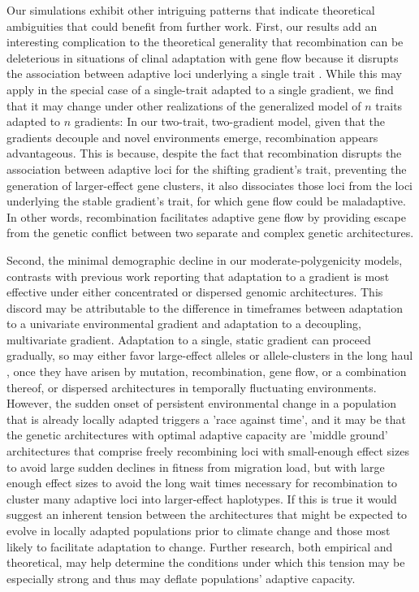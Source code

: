 \documentclass[9pt,twocolumn,twoside,lineno]{pnas-new}
\begin{document}
Our simulations exhibit other intriguing patterns
that indicate theoretical ambiguities that could benefit from further work.
First, our results add an interesting complication
to the theoretical generality that recombination can be deleterious
in situations of clinal adaptation
with gene flow because it disrupts the association between adaptive loci 
underlying a single trait \cite{tigano}.
While this may apply in the special case of a single-trait 
adapted to a single gradient,
we find that it may change under other realizations of the 
generalized model of $n$ traits adapted to $n$ gradients:
In our two-trait, two-gradient model, given that the gradients decouple
and novel environments emerge,
recombination appears advantageous.
This is because, despite the fact that recombination disrupts the association between
adaptive loci for the shifting gradient's trait, preventing the
generation of larger-effect gene clusters,
it also dissociates those loci from the loci underlying
the stable gradient's trait, for which gene flow could be maladaptive.
In other words, recombination facilitates adaptive gene flow
by providing escape from the genetic conflict between
two separate and complex genetic architectures.
 
Second, the minimal demographic decline
in our moderate-polygenicity models,
contrasts with previous work reporting that adaptation
to a gradient is most effective under either
concentrated or dispersed genomic architectures.
This discord may be attributable to the
difference in timeframes between adaptation to a univariate environmental gradient
and adaptation to a decoupling, multivariate gradient.
Adaptation to a single, static gradient can proceed gradually,
so may either favor large-effect alleles or allele-clusters in the long haul
\cite{yeaman_amnat,yeaman_review},
once they have arisen by mutation, recombination, gene flow, or a combination thereof,
or dispersed architectures 
\cite{burger,kondrashov,yeaman_review,yeaman_whitlock}
in temporally fluctuating environments.
However, the sudden onset of persistent environmental change 
in a population that is already locally adapted triggers a 'race against time', 
and it may be that the genetic architectures with
optimal adaptive capacity are 'middle ground' architectures that comprise
freely recombining loci with small-enough effect sizes to avoid large
sudden declines in fitness from migration load,
but with large enough effect sizes to avoid the long wait times necessary
for recombination to cluster many adaptive loci into larger-effect haplotypes.
If this is true it would suggest an inherent tension between the architectures that
might be expected to evolve in locally adapted populations prior to climate change
and those most likely to facilitate adaptation to change.
Further research, both empirical and theoretical,
may help determine the conditions under which this tension
may be especially strong and thus may deflate
populations' adaptive capacity.
 
\end{document}

